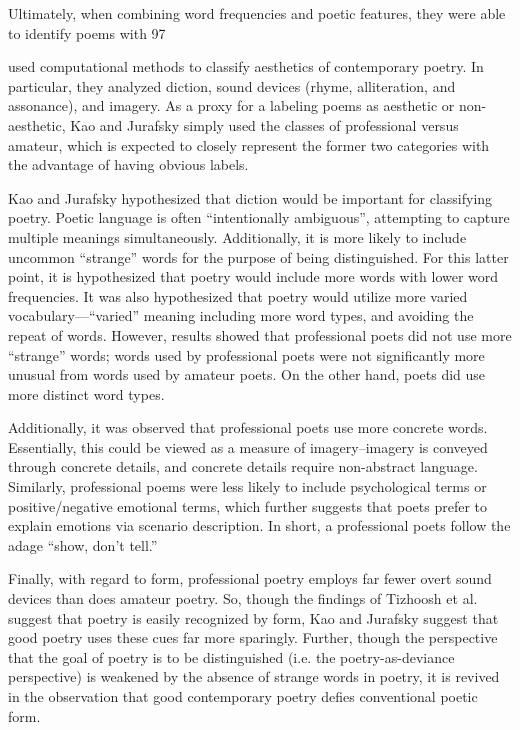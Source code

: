 \documentclass[11pt]{article}
\begin{document}
Ultimately, when combining word frequencies and poetic features, they were able to identify poems with 97%

 used computational methods to classify aesthetics of contemporary poetry. In particular, they analyzed diction, sound devices (rhyme, alliteration, and assonance), and imagery. As a proxy for a labeling poems as aesthetic or non-aesthetic, Kao and Jurafsky simply used the classes of professional versus amateur, which is expected to closely represent the former two categories with the advantage of having obvious labels.

Kao and Jurafsky hypothesized that diction would be important for classifying poetry. Poetic language is often ``intentionally ambiguous'', attempting to capture multiple meanings simultaneously. Additionally, it is more likely to include uncommon ``strange'' words for the purpose of being distinguished. For this latter point, it is hypothesized that poetry would include more words with lower word frequencies. It was also hypothesized that poetry would utilize more varied vocabulary---``varied'' meaning including more word types, and avoiding the repeat of words. However, results showed that professional poets did not use more ``strange'' words; words used by professional poets were not significantly more unusual from words used by amateur poets. On the other hand, poets did use more distinct word types.

Additionally, it was observed that professional poets use more concrete words. Essentially, this could be viewed as a measure of imagery--imagery is conveyed through concrete details, and concrete details require non-abstract language. Similarly, professional poems were less likely to include psychological terms or positive/negative emotional terms, which further suggests that poets prefer to explain emotions via scenario description. In short, a professional poets follow the adage ``show, don’t tell.''

Finally, with regard to form, professional poetry employs far fewer overt sound devices than does amateur poetry. So, though the findings of Tizhoosh et al. suggest that poetry is easily recognized by form, Kao and Jurafsky suggest that good poetry uses these cues far more sparingly. Further, though the perspective that the goal of poetry is to be distinguished (i.e. the poetry-as-deviance perspective) is weakened by the absence of strange words in poetry, it is revived in the observation that good contemporary poetry defies conventional poetic form.
\end{document}
